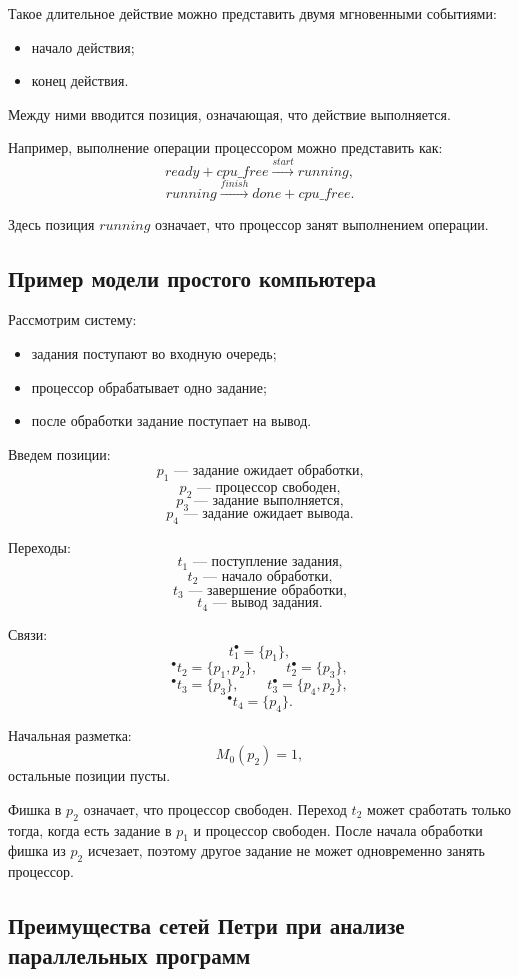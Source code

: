 \documentclass[12pt,a4paper]{article}
\begin{document}
Такое длительное действие можно представить двумя мгновенными событиями:
\begin{itemize}
    \item начало действия;
    \item конец действия.
\end{itemize}

Между ними вводится позиция, означающая, что действие выполняется.

Например, выполнение операции процессором можно представить как:
\[
ready + cpu\_free \xrightarrow{start} running,
\]
\[
running \xrightarrow{finish} done + cpu\_free.
\]

Здесь позиция $running$ означает, что процессор занят выполнением операции.

\subsection{Пример модели простого компьютера}

Рассмотрим систему:
\begin{itemize}
    \item задания поступают во входную очередь;
    \item процессор обрабатывает одно задание;
    \item после обработки задание поступает на вывод.
\end{itemize}

Введем позиции:
\[
p_1 \text{ --- задание ожидает обработки,}
\]
\[
p_2 \text{ --- процессор свободен,}
\]
\[
p_3 \text{ --- задание выполняется,}
\]
\[
p_4 \text{ --- задание ожидает вывода.}
\]

Переходы:
\[
t_1 \text{ --- поступление задания,}
\]
\[
t_2 \text{ --- начало обработки,}
\]
\[
t_3 \text{ --- завершение обработки,}
\]
\[
t_4 \text{ --- вывод задания.}
\]

Связи:
\[
t_1^\bullet = \{p_1\},
\]
\[
{}^\bullet t_2 = \{p_1,p_2\},
\qquad
t_2^\bullet = \{p_3\},
\]
\[
{}^\bullet t_3 = \{p_3\},
\qquad
t_3^\bullet = \{p_4,p_2\},
\]
\[
{}^\bullet t_4 = \{p_4\}.
\]

Начальная разметка:
\[
M_0(p_2)=1,
\]
остальные позиции пусты.

Фишка в $p_2$ означает, что процессор свободен. Переход $t_2$ может сработать только тогда, когда есть задание в $p_1$ и процессор свободен. После начала обработки фишка из $p_2$ исчезает, поэтому другое задание не может одновременно занять процессор.

\subsection{Преимущества сетей Петри при анализе параллельных программ}
\end{document}

